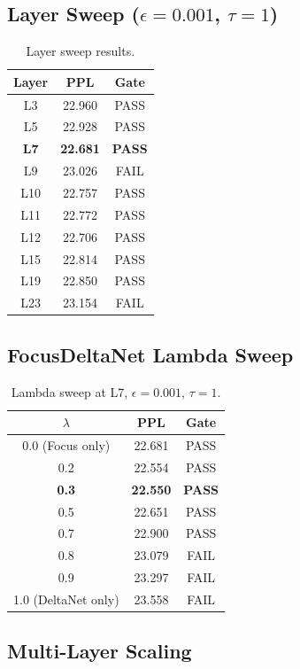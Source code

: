 \documentclass[11pt]{article}
\begin{document}
\subsection{Layer Sweep ($\epsilon=0.001$, $\tau=1$)}

\begin{table}[h]
\centering
\caption{Layer sweep results.}
\label{tab:layer}
\begin{tabular}{ccc}
\toprule
Layer & PPL & Gate \\
\midrule
L3 & 22.960 & PASS \\
L5 & 22.928 & PASS \\
\textbf{L7} & \textbf{22.681} & \textbf{PASS} \\
L9 & 23.026 & FAIL \\
L10 & 22.757 & PASS \\
L11 & 22.772 & PASS \\
L12 & 22.706 & PASS \\
L15 & 22.814 & PASS \\
L19 & 22.850 & PASS \\
L23 & 23.154 & FAIL \\
\bottomrule
\end{tabular}
\end{table}

\subsection{FocusDeltaNet Lambda Sweep}

\begin{table}[h]
\centering
\caption{Lambda sweep at L7, $\epsilon=0.001$, $\tau=1$.}
\label{tab:lambda}
\begin{tabular}{ccc}
\toprule
$\lambda$ & PPL & Gate \\
\midrule
0.0 (Focus only) & 22.681 & PASS \\
0.2 & 22.554 & PASS \\
\textbf{0.3} & \textbf{22.550} & \textbf{PASS} \\
0.5 & 22.651 & PASS \\
0.7 & 22.900 & PASS \\
0.8 & 23.079 & FAIL \\
0.9 & 23.297 & FAIL \\
1.0 (DeltaNet only) & 23.558 & FAIL \\
\bottomrule
\end{tabular}
\end{table}

\subsection{Multi-Layer Scaling}
\end{document}
